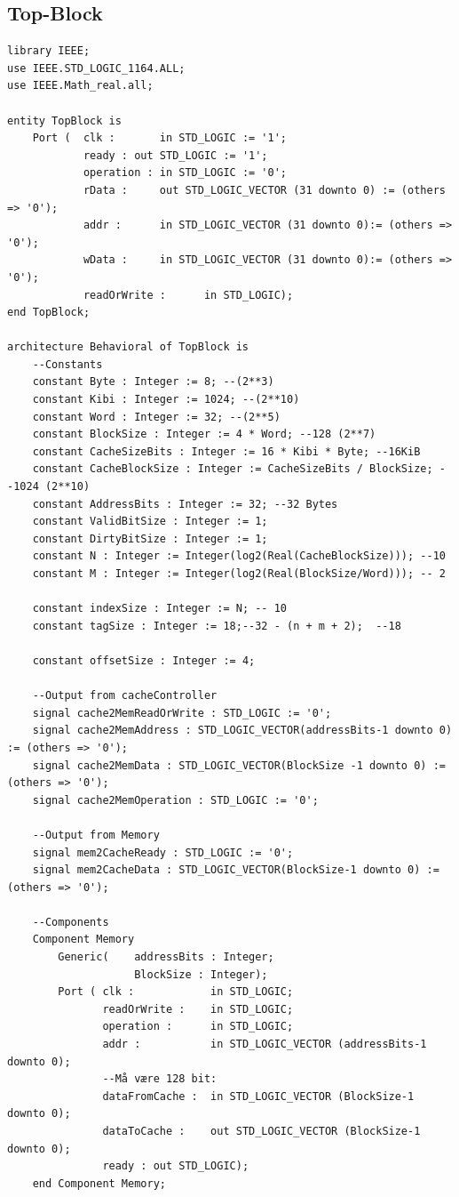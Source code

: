 \documentclass{article}
\begin{document}
\subsection{Top-Block}
\begin{lstlisting}
library IEEE;
use IEEE.STD_LOGIC_1164.ALL;
use IEEE.Math_real.all;

entity TopBlock is
    Port (  clk :       in STD_LOGIC := '1';
            ready : out STD_LOGIC := '1';
            operation : in STD_LOGIC := '0';
            rData :     out STD_LOGIC_VECTOR (31 downto 0) := (others => '0');
            addr :      in STD_LOGIC_VECTOR (31 downto 0):= (others => '0');
            wData :     in STD_LOGIC_VECTOR (31 downto 0):= (others => '0');
            readOrWrite :      in STD_LOGIC);
end TopBlock;

architecture Behavioral of TopBlock is
    --Constants
    constant Byte : Integer := 8; --(2**3)
    constant Kibi : Integer := 1024; --(2**10)
    constant Word : Integer := 32; --(2**5)
    constant BlockSize : Integer := 4 * Word; --128 (2**7)
    constant CacheSizeBits : Integer := 16 * Kibi * Byte; --16KiB
    constant CacheBlockSize : Integer := CacheSizeBits / BlockSize; --1024 (2**10) 
    constant AddressBits : Integer := 32; --32 Bytes
    constant ValidBitSize : Integer := 1;
    constant DirtyBitSize : Integer := 1;
    constant N : Integer := Integer(log2(Real(CacheBlockSize))); --10
    constant M : Integer := Integer(log2(Real(BlockSize/Word))); -- 2
    
    constant indexSize : Integer := N; -- 10
    constant tagSize : Integer := 18;--32 - (n + m + 2);  --18
    
    constant offsetSize : Integer := 4;
    
    --Output from cacheController
    signal cache2MemReadOrWrite : STD_LOGIC := '0';
    signal cache2MemAddress : STD_LOGIC_VECTOR(addressBits-1 downto 0) := (others => '0');
    signal cache2MemData : STD_LOGIC_VECTOR(BlockSize -1 downto 0) := (others => '0');
    signal cache2MemOperation : STD_LOGIC := '0';
    
    --Output from Memory
    signal mem2CacheReady : STD_LOGIC := '0';
    signal mem2CacheData : STD_LOGIC_VECTOR(BlockSize-1 downto 0) := (others => '0');
    
    --Components
    Component Memory
        Generic(    addressBits : Integer;
                    BlockSize : Integer); 
        Port ( clk :            in STD_LOGIC;
               readOrWrite :    in STD_LOGIC;
               operation :      in STD_LOGIC;
               addr :           in STD_LOGIC_VECTOR (addressBits-1 downto 0);
               --Må være 128 bit:
               dataFromCache :  in STD_LOGIC_VECTOR (BlockSize-1 downto 0);
               dataToCache :    out STD_LOGIC_VECTOR (BlockSize-1 downto 0);
               ready : out STD_LOGIC);
    end Component Memory;
    

\end{lstlisting}
\end{document}
